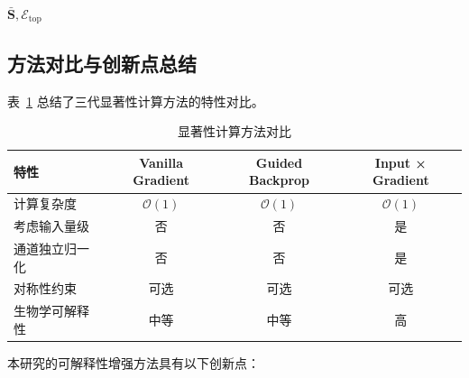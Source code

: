 \documentclass[UTF8, a4paper, 12pt]{article}
\begin{document}
\begin{algorithm}
  \centering
  \caption{群体水平显著性聚合与可视化筛选}
  \label{alg:saliency_aggregation}
  \small


  \BlankLine



  \Return $\bar{\mathbf{S}}, \mathcal{E}_{\text{top}}$
\end{algorithm}

\subsection{方法对比与创新点总结}

表~\ref{tab:interpretability_comparison} 总结了三代显著性计算方法的特性对比。

\begin{table}[htbp]
\centering
\caption{显著性计算方法对比}
\label{tab:interpretability_comparison}
\begin{tabular}{lccc}
\toprule
特性 & Vanilla Gradient & Guided Backprop & Input × Gradient \\
\midrule
计算复杂度 & $\mathcal{O}(1)$ & $\mathcal{O}(1)$ & $\mathcal{O}(1)$ \\
考虑输入量级 & 否 & 否 & 是 \\
通道独立归一化 & 否 & 否 & 是 \\
对称性约束 & 可选 & 可选 & 可选 \\
生物学可解释性 & 中等 & 中等 & 高 \\
\bottomrule
\end{tabular}
\end{table}

本研究的可解释性增强方法具有以下创新点：
\end{document}
